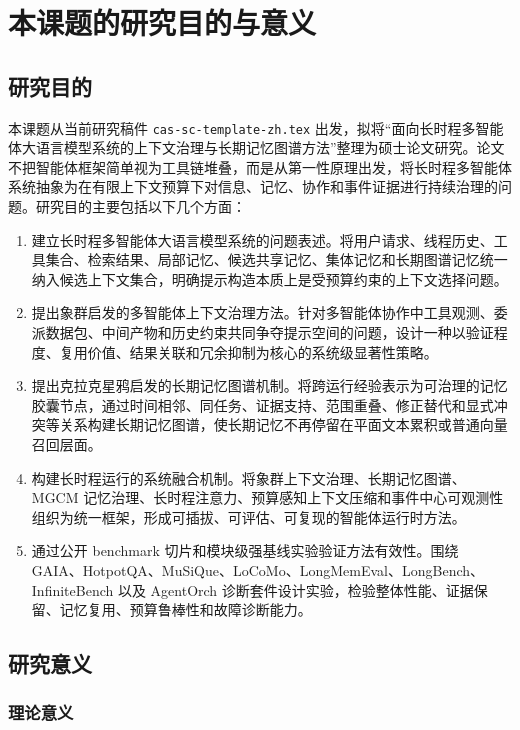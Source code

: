 \documentclass[UTF8,a4paper,zihao=-4,fontset=windows]{ctexart}
\begin{document}
\tableofcontents
\newpage

\section{本课题的研究目的与意义}

\subsection{研究目的}

本课题从当前研究稿件 \texttt{cas-sc-template-zh.tex} 出发，拟将“面向长时程多智能体大语言模型系统的上下文治理与长期记忆图谱方法”整理为硕士论文研究。论文不把智能体框架简单视为工具链堆叠，而是从第一性原理出发，将长时程多智能体系统抽象为在有限上下文预算下对信息、记忆、协作和事件证据进行持续治理的问题。研究目的主要包括以下几个方面：

\begin{enumerate}[label=\arabic*.]
  \item 建立长时程多智能体大语言模型系统的问题表述。将用户请求、线程历史、工具集合、检索结果、局部记忆、候选共享记忆、集体记忆和长期图谱记忆统一纳入候选上下文集合，明确提示构造本质上是受预算约束的上下文选择问题。
  \item 提出象群启发的多智能体上下文治理方法。针对多智能体协作中工具观测、委派数据包、中间产物和历史约束共同争夺提示空间的问题，设计一种以验证程度、复用价值、结果关联和冗余抑制为核心的系统级显著性策略。
  \item 提出克拉克星鸦启发的长期记忆图谱机制。将跨运行经验表示为可治理的记忆胶囊节点，通过时间相邻、同任务、证据支持、范围重叠、修正替代和显式冲突等关系构建长期记忆图谱，使长期记忆不再停留在平面文本累积或普通向量召回层面。
  \item 构建长时程运行的系统融合机制。将象群上下文治理、长期记忆图谱、MGCM 记忆治理、长时程注意力、预算感知上下文压缩和事件中心可观测性组织为统一框架，形成可插拔、可评估、可复现的智能体运行时方法。
  \item 通过公开 benchmark 切片和模块级强基线实验验证方法有效性。围绕 GAIA、HotpotQA、MuSiQue、LoCoMo、LongMemEval、LongBench、InfiniteBench 以及 AgentOrch 诊断套件设计实验，检验整体性能、证据保留、记忆复用、预算鲁棒性和故障诊断能力。
\end{enumerate}

\subsection{研究意义}

\subsubsection{理论意义}
\end{document}
